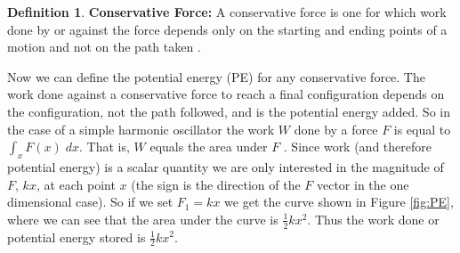 \documentclass{article}
\theoremstyle{definition}
\newtheorem{definition}{Definition}[section]
\begin{document}
\medskip
\begin{definition} {\bf Conservative Force:} A conservative force 
is one for which work done by or against the force depends only 
on the starting and ending points of a motion and not on the path 
taken \cite{wiki:potential_energy}.
\end{definition}

\medskip
\noindent
Now we can define the potential energy (PE) for any conservative
force.  The work done against a conservative force to reach a
final configuration depends on the configuration, not the path
followed, and is the potential energy added. So in the case of a
simple harmonic oscillator the work $W$ done by a force $F$ is
equal to $\int_{x} F(x) \; dx$. That is, $W$ equals the area under
$F$ \cite{wiki:conservative_force}. Since work (and therefore
potential energy) is a scalar quantity
\cite{elastic_potential_energy} we are only interested in the
magnitude of $F$, $kx$, at each point $x$ (the sign is the
direction of the $F$ vector in the one dimensional case). So if
we set $F_{1} = kx$ we get the curve shown in Figure
\ref{fig:PE}, where we can see that the area under the curve is
$\frac{1}{2} kx^2$. Thus the work done or potential energy stored
is $\frac{1}{2} kx^2$.
%
%	
\end{document}
